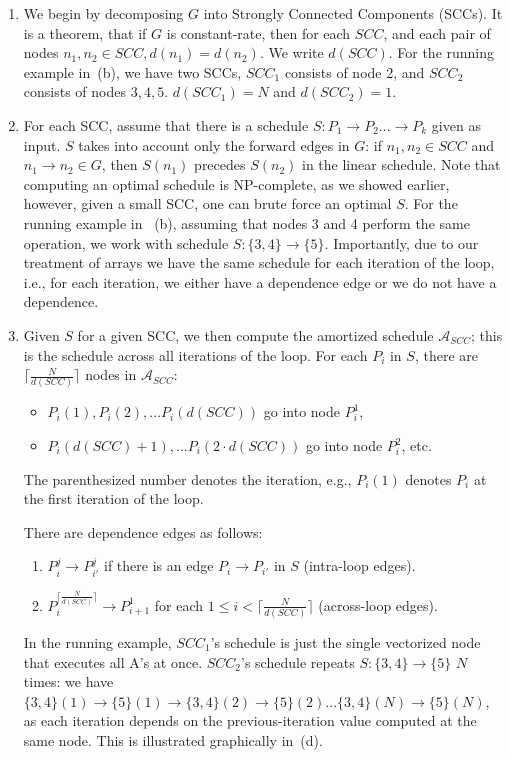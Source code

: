 \documentclass[sigconf, screen, natbib=false, dvipsnames, table]{acmart}
\theoremstyle{definition}
\begin{document}
\begin{enumerate}

\item We begin by decomposing $G$ into Strongly Connected Components (SCCs). It is a theorem, that if $G$ is constant-rate, 
then for each $\mathit{SCC}$, and each pair of nodes $n_1, n_2 \in \mathit{SCC}, d(n_1) = d(n_2)$. We write $d(\mathit{SCC})$.
For the running example in~(b), we have two SCCs, $SCC_1$ consists of node 2, and $SCC_2$ 
consists of nodes $3,4,5$. $d(\mathit{SCC}_1) = N$ and $d(\mathit{SCC}_2) = 1$.

\item For each SCC, assume that there is a schedule $S: P_1 \rightarrow P_2 ... \rightarrow P_k$ given 
as input. $S$ takes into account only the forward edges in $G$: if $n_1, n_2 \in SCC$ and $n_1 \rightarrow n_2 \in G$, 
then $S(n_1)$ precedes $S(n_2)$ in the linear schedule. Note that computing an optimal schedule is NP-complete, 
as we showed earlier, however, given a small SCC, one can brute force an optimal $S$. For the running example in 
~(b), assuming that nodes 3 and 4 perform the same operation, we work with schedule 
$S: \{3,4\} \rightarrow \{5\}$. Importantly, due to our treatment of arrays we have the same schedule for 
each iteration of the loop, i.e., for each iteration, we either have a dependence edge or we do not have a dependence.

\item Given $S$ for a given SCC, we then compute the amortized schedule $\mathcal{A}_{\mathit{SCC}}$; 
this is the schedule across all iterations of the loop. For each $P_i$ in $S$, there are $\lceil{\frac{N}{d(SCC)}}\rceil$
nodes in $\mathcal{A}_{\mathit{SCC}}$:
\begin{itemize}
\item[] $P_i(1),P_i(2),...P_i(d(SCC))$ go into node $P^1_i$, 
\item[] $P_i(d(SCC)+1),...P_i(2\cdot d(SCC))$ go into node $P^2_i$, etc. 
\end{itemize}
The parenthesized number denotes the iteration, e.g., $P_i(1)$ denotes $P_i$ at the first iteration 
of the loop. 

There are dependence edges as follows:
\begin{enumerate}
\item $P^j_i \rightarrow P^j_{i'}$ if there is an edge $P_i \rightarrow P_{i'}$ in $S$ (intra-loop edges).
\item $P^{\lceil{\frac{N}{d(SCC)}}\rceil}_i \rightarrow P^1_{i+1}$ for each $1 \le i < \lceil{\frac{N}{d(SCC)}}\rceil$ (across-loop edges).
\end{enumerate}
In the running example, $SCC_1$'s schedule is just the single vectorized node that executes all A's at once.
$SCC_2$'s schedule repeats $S: \{3,4\} \rightarrow \{5\}$ $N$ times: we have $\{3,4\}(1) \rightarrow \{5\}(1) \rightarrow \{3,4\}(2) \rightarrow \{5\}(2) ... \{3,4\}(N) \rightarrow \{5\}(N)$, 
as each iteration depends on the previous-iteration value computed at the same node.
This is illustrated graphically in~(d).



\end{enumerate}
\end{document}
